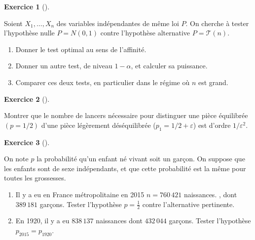 \documentclass[
  10,
  letterpaper,
  DIV=11,
  numbers=noendperiod]{scrreport}
\providecommand{\tightlist}{%
  \setlength{\itemsep}{0pt}\setlength{\parskip}{0pt}}\usepackage{longtable,booktabs,array}
\theoremstyle{plain}
\theoremstyle{definition}
\newtheorem{exercise}{Exercice}[chapter]
\theoremstyle{plain}
\theoremstyle{definition}
\theoremstyle{definition}
\theoremstyle{plain}
\theoremstyle{remark}
\begin{document}
\begin{exercise}[]\protect\hypertarget{exr-testrandom}{}\label{exr-testrandom}

Soient \(X_1, \dotsc, X_n\) des variables indépendantes de même loi
\(P\). On cherche à tester l'hypothèse nulle \(P = N(0,1)\) contre
l'hypothèse alternative \(P = \mathscr{T}(n)\).

\begin{enumerate}
\def\labelenumi{\arabic{enumi}.}
\tightlist
\item
  Donner le test optimal au sens de l'affinité.
\item
  Donner un autre test, de niveau \(1-\alpha\), et calculer sa
  puissance.
\item
  Comparer ces deux tests, en particulier dans le régime où \(n\) est
  grand.
\end{enumerate}

\end{exercise}

\begin{exercise}[]\protect\hypertarget{exr-samplecomplexity}{}\label{exr-samplecomplexity}

Montrer que le nombre de lancers nécessaire pour distinguer une pièce
équilibrée \((p=1/2)\) d'une pièce légèrement déséquilibrée
(\(p_1 = 1/2 + \varepsilon\)) est d'ordre \(1/\varepsilon^2\).

\end{exercise}

\begin{exercise}[]\protect\hypertarget{exr-bintest}{}\label{exr-bintest}

On note \(p\) la probabilité qu'un enfant né vivant soit un garçon. On
suppose que les enfants sont de sexe indépendants, et que cette
probabilité est la même pour toutes les grossesses.

\begin{enumerate}
\def\labelenumi{\arabic{enumi}.}
\tightlist
\item
  Il y a eu en France métropolitaine en 2015 \(n=760\,421\) naissances.
  , dont \(389\,181\) garçons. Tester l'hypothèse \(p=\frac12\) contre
  l'alternative pertinente.
\item
  En 1920, il y a eu \(838\,137\) naissances dont \(432\,044\) garçons.
  Tester l'hypothèse \(p_{2015}=p_{1920}\).
\end{enumerate}

\end{exercise}
\end{document}
